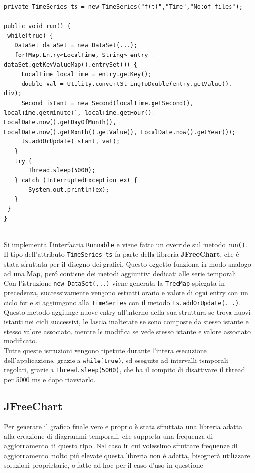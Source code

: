 \begin{lstlisting}[autogobble, title={\texttt{DataSetRealTime.java}}]
private TimeSeries ts = new TimeSeries("f(t)","Time","No:of files");

public void run() {
 while(true) {
   DataSet dataSet = new DataSet(...);
   for(Map.Entry<LocalTime, String> entry : dataSet.getKeyValueMap().entrySet()) {
     LocalTime localTime = entry.getKey();
     double val = Utility.convertStringToDouble(entry.getValue(), div);
     Second istant = new Second(localTime.getSecond(), localTime.getMinute(), localTime.getHour(), LocalDate.now().getDayOfMonth(), LocalDate.now().getMonth().getValue(), LocalDate.now().getYear());
     ts.addOrUpdate(istant, val);
   }
   try {
       Thread.sleep(5000);
   } catch (InterruptedException ex) {
       System.out.println(ex);
   }
 }
}
\end{lstlisting}
\\
Si implementa l'interfaccia \texttt{Runnable} e viene fatto un override sul metodo \texttt{run()}.
Il tipo dell'attributo \texttt{TimeSeries ts} fa parte della libreria \textbf{JFreeChart}, che é stata sfruttata per il disegno dei grafici.
Questo oggetto funziona in modo analogo ad una Map, peró contiene dei metodi aggiuntivi dedicati alle serie temporali.\\
Con l'istruzione \texttt{new DataSet(...)} viene generata la \texttt{TreeMap} spiegata in precedenza, successivamente
vengono estratti orario e valore di ogni entry con un ciclo for e si aggiungono alla \texttt{TimeSeries} con
il metodo \texttt{ts.addOrUpdate(...)}.
Questo metodo aggiunge nuove entry all'interno della sua struttura se trova nuovi istanti nei cicli successivi,
le lascia inalterate se sono composte da stesso istante e stesso valore associato, mentre le modifica se vede stesso istante e valore associato
modificato.
\\
Tutte queste istruzioni vengono ripetute durante l'intera esecuzione dell'applicazione, grazie a \texttt{while(true)}, ed eseguite ad intervalli temporali regolari,
grazie a \texttt{Thread.sleep(5000)}, che ha il compito di disattivare il thread per 5000 ms e dopo riavviarlo.
\subsection{JFreeChart}
Per generare il grafico finale vero e proprio è stata sfruttata una libreria adatta alla creazione di diagrammi temporali, che supporta una frequenza di
aggiornamento di questo tipo.
Nel caso in cui volessimo sfruttare frequenze di aggiornamento molto piú elevate questa libreria non é adatta,
bisognerà utilizzare soluzioni proprietarie, o fatte ad hoc per il caso d'uso in questione.

